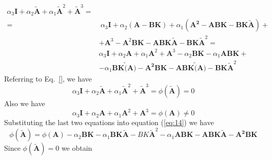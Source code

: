 \documentclass[12pt,a4paper,oneside]{book}
\begin{document}
\begin{onehalfspace}
\begin{equation} \label{ackermann_5}
	\begin{split}
		\alpha_3\mathbf{I}+\alpha_2\tilde{\mathbf{A}}+\alpha_1\tilde{\mathbf{A}}^2+\tilde{\mathbf{A}}^3 = & \\
		= & \:\alpha_3\mathbf{I}+\alpha_2\mathbf{(A-BK)}+\alpha_1(\mathbf{A^2-ABK-BK}\tilde{\mathbf{A}})+\\
		& +\mathbf{A}^3-\mathbf{A}^2\mathbf{BK} -\mathbf{ABK}\tilde{\mathbf{A}}-\mathbf{BK}\tilde{\mathbf{A}}^2 = \\
		& \alpha_3\mathbf{I}+\alpha_2\mathbf{A}+\alpha_1\mathbf{A}^2+\mathbf{A}^3-\alpha_2\mathbf{BK}-\alpha_1\mathbf{ABK}+\\
		&-\alpha_1\mathbf{BK}\tilde(\mathbf{A})-\mathbf{A^2BK-ABK}\tilde(\mathbf{A})-\mathbf{BK}\tilde{\mathbf{A}}^2
	\end{split}
\end{equation}
Referring to Eq.~\eqref{}, we have
\begin{equation*}
	\alpha_3\mathbf{I}+\alpha_2\tilde{\mathbf{A}}+\alpha_1 
	\tilde{\mathbf{A}}^2+\tilde{\mathbf{A}}^3=\phi(\tilde{\mathbf{A}})=0
\end{equation*}
Also we have
\begin{equation*}
	\alpha_3\mathbf{I}+\alpha_2\mathbf{A}+\alpha_1\mathbf{A}^2+ 
	\mathbf{A}^3=\phi(\mathbf{A})\not =0
\end{equation*}
Substituting the last two equations into equation (\ref{eq:14}) we have
\begin{equation*}
	\phi(\tilde{\mathbf{A}})=\phi(\mathbf{A})-\alpha_2\mathbf{BK}- 
	\alpha_1\mathbf{BK}\tilde{\mathbf{A}}-BK\tilde{\mathbf{A}}^2- 
	\alpha_1\mathbf{ABK-ABK}\tilde{\mathbf{A}}-\mathbf{A^2BK}
\end{equation*}
Since $\phi(\tilde{\mathbf{A}})=0$ we obtain


\end{onehalfspace}
\end{document}
